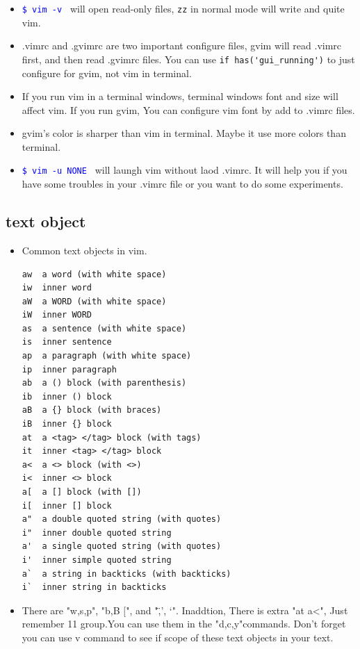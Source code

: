 \documentclass[a4paper,12pt,twoside]{book}
\newcommand{\linuxcommand}[1]{\texttt{\textcolor{blue}{\$ #1 \Pisymbol{psy}{191}}}}
\begin{document}
\begin{itemize}
\item \linuxcommand{vim -v} will open read-only files, \verb!zz! in normal mode  will write and quite vim.

\item .vimrc and .gvimrc are two important configure files, gvim  will read .vimrc first, and then read .gvimrc files.  You can use \verb=if has('gui_running')= to just configure for gvim, not vim in terminal. 

\item If you run vim in a terminal windows, terminal windows font and size will affect vim.  If you run gvim, You can configure vim font by add to .vimrc files.  

\item gvim's color is sharper than vim in terminal.  Maybe it use more colors than terminal.  

\item \linuxcommand{vim -u NONE} will laungh vim without laod .vimrc. It will
    help you if you have some troubles in your .vimrc file or you want to do
    some experiments. 
\end{itemize}

\subsection{text object}
\begin{itemize}
		\item Common text objects in vim. 
\begin{verbatim}
aw	a word (with white space)
iw	inner word
aW	a WORD (with white space)
iW	inner WORD
as	a sentence (with white space)
is	inner sentence
ap	a paragraph (with white space)
ip	inner paragraph
ab	a () block (with parenthesis)
ib	inner () block
aB	a {} block (with braces)
iB	inner {} block
at	a <tag> </tag> block (with tags)
it	inner <tag> </tag> block
a<	a <> block (with <>)
i<	inner <> block
a[	a [] block (with [])
i[	inner [] block
a"	a double quoted string (with quotes)
i"	inner double quoted string
a'	a single quoted string (with quotes)
i'	inner simple quoted string
a`	a string in backticks (with backticks)
i`	inner string in backticks
\end{verbatim}
\item There are "w,s,p", "b,B $[$", and "\",', `". Inaddtion, There is extra "at a<", Just remember 11 group.You can use them in the "d,c,y"commands. Don't forget you can use v command to see if scope of these text objects in your text.
				
		\end{itemize}
\end{document}
